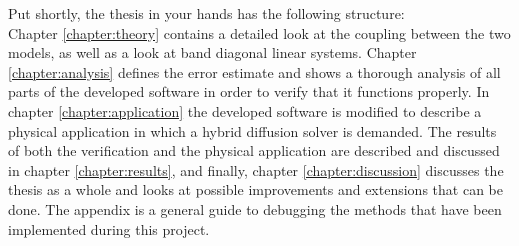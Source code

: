 \noindent Put shortly, the thesis in your hands has the following structure: \\
Chapter \ref{chapter:theory} contains a detailed look at the coupling between the two models, as well as a look at band diagonal linear systems. 
Chapter \ref{chapter:analysis} defines the error estimate and shows a thorough analysis of all parts of the developed software in order to verify that it functions properly. 
In chapter \ref{chapter:application} the developed software is modified to describe a physical application in which a hybrid diffusion solver is demanded. 
The results of both the verification and the physical application are described and discussed in chapter \ref{chapter:results}, and finally, chapter \ref{chapter:discussion} discusses the thesis as a whole and looks at possible improvements and extensions that can be done. 
The appendix is a general guide to debugging the methods that have been implemented during this project.